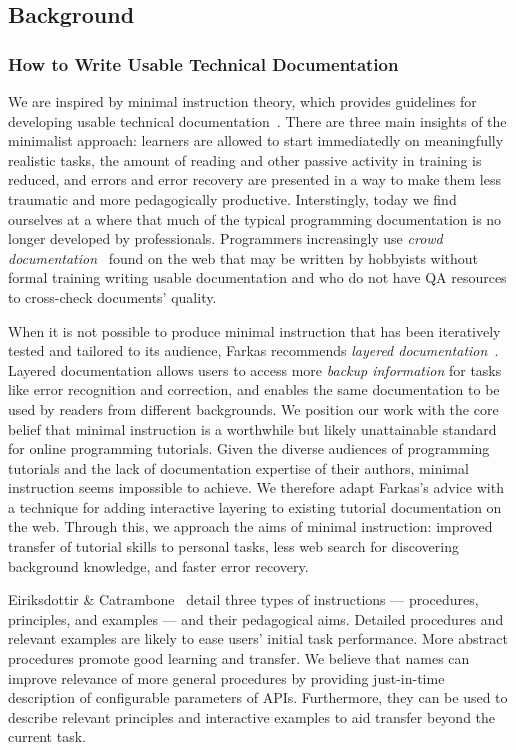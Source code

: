 \subsection{Background}

\subsubsection{How to Write Usable Technical Documentation}

We are inspired by minimal instruction theory, which provides guidelines for developing usable technical documentation~\cite{carroll_nurnberg_1990}.
There are three main insights of the minimalist approach:
learners are allowed to start immediatedly on meaningfully realistic tasks,
the amount of reading and other passive activity in training is reduced,
and errors and error recovery are presented in a way to make them less traumatic and more pedagogically productive.
Interstingly, today we find ourselves at a where that much of the typical programming documentation is no longer developed by professionals.
Programmers increasingly use \emph{crowd documentation}~\cite{parnin_measuring_2011} found on the web that may be written by hobbyists without formal training writing usable documentation and who do not have QA resources to cross-check documents' quality.

When it is not possible to produce minimal instruction that has been iteratively tested and tailored to its audience, Farkas recommends \emph{layered documentation}~\cite{farkas_layering_1998}.
Layered documentation allows users to access more \emph{backup information} for tasks like error recognition and correction, and enables the same documentation to be used by readers from different backgrounds.
We position our work with the core belief that minimal instruction is a worthwhile but likely unattainable standard for online programming tutorials.
Given the diverse audiences of programming tutorials and the lack of documentation expertise of their authors, minimal instruction seems impossible to achieve.
We therefore adapt Farkas's advice with a technique for adding interactive layering to existing tutorial documentation on the web.
Through this, we approach the aims of minimal instruction: improved transfer of tutorial skills to personal tasks, less web search for discovering background knowledge, and faster error recovery.

Eiriksdottir \& Catrambone~\cite{eiriksdottir_procedural_2011} detail three types of instructions --- procedures, principles, and examples --- and their pedagogical aims.
Detailed procedures and relevant examples are likely to ease users' initial task performance.
More abstract procedures promote good learning and transfer.
We believe that \glspl{name} can improve relevance of more general procedures by providing just-in-time description of configurable parameters of APIs.
Furthermore, they can be used to describe relevant principles and interactive examples to aid transfer beyond the current task.

